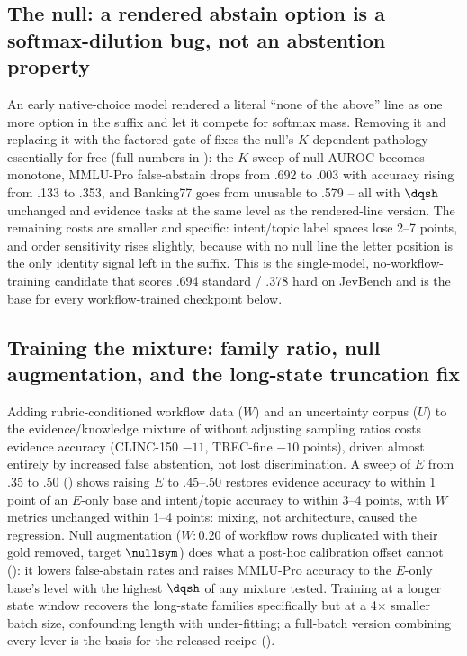 \subsection{The null: a rendered abstain option is a softmax-dilution bug, not an abstention property}
\label{sec:results:null}

An early native-choice model rendered a literal ``none of the above'' line as one more option in the
suffix and let it compete for softmax mass. Removing it and replacing it with the factored gate of
 fixes the null's $K$-dependent pathology essentially for free (full numbers in
): the $K$-sweep of null AUROC becomes monotone, MMLU-Pro false-abstain drops from
.692 to .003 with accuracy rising from .133 to .353, and Banking77 goes from unusable to .579 -- all with
$\dqsh$ unchanged and evidence tasks at the same level as the rendered-line version. The remaining costs
are smaller and specific: intent/topic label spaces lose 2--7 points, and order sensitivity rises slightly,
because with no null line the letter position is the only identity signal left in the suffix. This is the
single-model, no-workflow-training candidate that scores .694 standard / .378 hard on JevBench and is the
base for every workflow-trained checkpoint below.

\subsection{Training the mixture: family ratio, null augmentation, and the long-state truncation fix}
\label{sec:results:mixture}

Adding rubric-conditioned workflow data ($W$) and an uncertainty corpus ($U$) to the evidence/knowledge
mixture of  without adjusting sampling ratios costs evidence accuracy (CLINC-150
$-11$, TREC-fine $-10$ points), driven almost entirely by increased false abstention, not lost
discrimination. A sweep of $E$ from .35 to .50 () shows raising $E$ to .45--.50
restores evidence accuracy to within 1 point of an $E$-only base and intent/topic accuracy to within 3--4
points, with $W$ metrics unchanged within 1--4 points: mixing, not architecture, caused the regression.
Null augmentation ($W{:}0.20$ of workflow rows duplicated with their gold removed, target $\nullsym$) does
what a post-hoc calibration offset cannot (): it lowers false-abstain rates
and raises MMLU-Pro accuracy to the $E$-only base's level with the highest $\dqsh$ of any mixture tested.
Training at a longer state window recovers the long-state families specifically but at a 4$\times$ smaller
batch size, confounding length with under-fitting; a full-batch version combining every lever is the basis
for the released recipe ().

